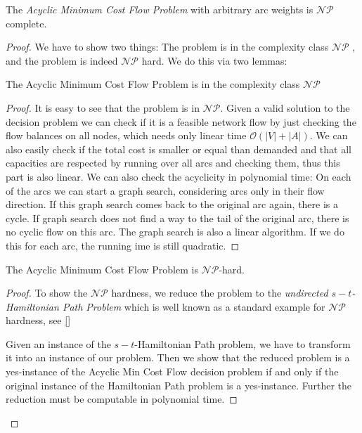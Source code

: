 \begin{theorem}
 The \textit{Acyclic Minimum Cost Flow Problem} with arbitrary arc weights is $\mathcal{NP}$ complete.
\end{theorem}
\begin{proof}
 We have to show two things: The problem is in the complexity class $\mathcal{NP}$ , and the problem is indeed 
$\mathcal{NP}$ hard. We do this via two lemmas:
\begin{lemma}
 The Acyclic Minimum Cost Flow Problem is in the complexity class $\mathcal{NP}$
\end{lemma}
\begin{proof}
It is easy to see that the problem is in $\mathcal{NP}$. Given a valid solution to the decision problem we can check if 
it is a feasible network flow by just checking the flow balances on all nodes, which needs only linear time 
$\mathcal{O}(|V|+|A|)$. We can also easily check if the total cost is smaller or equal than demanded and that all 
capacities are respected by running over all arcs and checking them, thus this part is also linear.
We can also check the acyclicity in polynomial time: On each of the arcs we can start a graph search, considering arcs 
only in their flow direction. If this graph search comes back to the original arc again, there is a cycle. %
If graph search does not find a way to the tail of the original arc, there is no cyclic flow on this arc. The graph 
search is also a linear algorithm. If we do this for each arc, the running ime is still quadratic.
\end{proof}

\begin{lemma}
 The Acyclic Minimum Cost Flow Problem is $\mathcal{NP}$-hard.
\end{lemma}
\begin{proof}

To show the $\mathcal{NP}$ hardness, we reduce the problem to the \textit{undirected $s-t$-Hamiltonian Path Problem} 
which is well known as a standard example for $\mathcal{NP}$ hardness, see \ref{} 

Given an instance of the $s-t$-Hamiltonian Path problem, we have to transform it into an instance of our problem. Then 
we show that the reduced problem is a yes-instance of the Acyclic Min Cost Flow decision problem if and only if the 
original instance of the Hamiltonian Path problem is a yes-instance. Further the reduction must be computable in 
polynomial time.
 

\end{proof}
\end{proof}
